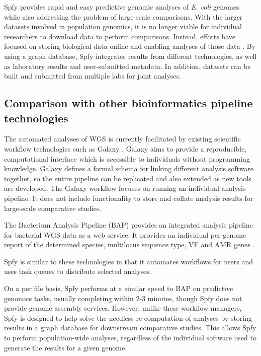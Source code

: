 \documentclass{article}
\begin{document}
Spfy provides rapid and easy predictive genomic analyses of \textit{E. coli} genomes while also addressing the problem of large scale comparisons. With the larger datasets involved in population genomics, it is no longer viable for individual researchers to download data to perform comparisons. Instead, efforts have focused on storing biological data online and enabling analyses of those data \cite{schatz2015biological}. By using a graph database, Spfy integrates results from  different technologies, as well as laboratory results and user-submitted metadata. In addition, datasets can be built and submitted from multiple labs for joint analyses.

\subsection{Comparison with other bioinformatics pipeline technologies}


The automated analyses of WGS is currently facilitated by existing scientific workflow technologies such as Galaxy \cite{goecks2010galaxy}. Galaxy aims to provide a reproducible, computational interface which is accessible to individuals without programming knowledge. Galaxy defines a formal schema for linking different analysis software together, so the entire pipeline can be replicated and also extended as new tools are developed. The Galaxy workflow focuses on running an individual analysis pipeline. It does not include functionality to store and collate analysis results for large-scale comparative studies.

The Bacterium Analysis Pipeline (BAP) \cite{thomsen2016bacterial} provides an integrated analysis pipeline for bacterial WGS data as a web service. It provides an individual per-genome report of the determined species, multilocus sequence type, VF and AMR genes \cite{thomsen2016bacterial}.

Spfy is similar to these technologies in that it automates workflows for users and uses task queues to distribute selected analyses.

On a per file basis, Spfy performs at a similar speed to BAP on predictive genomics tasks, usually completing within 2-3 minutes, though Spfy does not provide genome assembly services.
However, unlike these workflow managers, Spfy is designed to help solve the needless re-computation of analyses by storing results in a graph database for downstream comparative studies. This allows Spfy to perform population-wide analyses, regardless of the individual software used to generate the results for a given genome.
\end{document}
